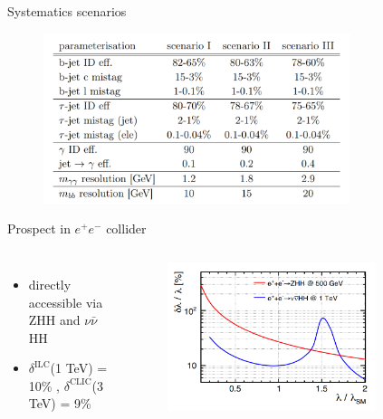 \begin{frame}{Systematics scenarios}
\begin{figure}
    \centering
    \includegraphics[width=0.8\textwidth]{BackUp/Part4/Img/Sys_FCC.png}
\end{figure}
\end{frame}

\begin{frame}{Prospect in $e^{+}e^{-}$ collider}
\begin{columns}
\begin{itemize}
    \item directly accessible via ZHH and $\nu\bar{\nu}$HH
    \item $\delta^{\text{ILC}}$(1 TeV) = 10\% , $\delta^{\text{CLIC}}$(3 TeV) = 9\%
\end{itemize}

\begin{figure}
    \centering
    \includegraphics[width=0.8\textwidth]{BackUp/Part4/Img/kl_preci_ILC.png}
\end{figure}

\end{columns}
\end{frame}

